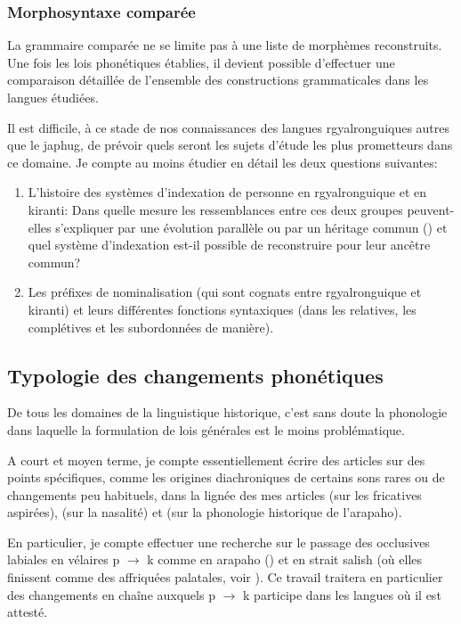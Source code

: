 \documentclass[oldfontcommands,oneside,a4paper,11pt]{article}
\newcommand{\ipa}[1]{{\phon #1}} %
\begin{document}
\subsubsection{Morphosyntaxe comparée}
La grammaire comparée ne se limite pas à une liste de morphèmes reconstruits. Une fois les lois phonétiques établies, il devient possible d'effectuer une comparaison détaillée de l'ensemble des constructions grammaticales dans les langues étudiées.

Il est difficile, à ce stade de nos connaissances des langues rgyalronguiques autres que le japhug, de prévoir quels seront les sujets d'étude les plus prometteurs dans ce domaine. Je compte au moins étudier en détail les deux questions suivantes:
\begin{enumerate}
\item L'histoire des systèmes d'indexation de personne en rgyalronguique et en kiranti: Dans quelle mesure les ressemblances entre ces deux groupes peuvent-elles s'expliquer par une évolution parallèle ou par un héritage commun (\citealt{jacques12agreement}) et quel système d'indexation est-il possible de reconstruire pour leur ancêtre commun?
\item Les préfixes de nominalisation (qui sont cognats entre rgyalronguique et kiranti) et leurs différentes fonctions syntaxiques (dans les relatives, les complétives et les subordonnées de manière).
\end{enumerate}

 



\subsection{Typologie des changements phonétiques } \label{sec:phonetique}
De tous les domaines de la linguistique historique, c'est sans doute la phonologie dans laquelle la formulation de lois générales est le moins problématique. 

A court et moyen terme, je compte essentiellement écrire des articles sur des points spécifiques, comme les origines diachroniques de certains sons rares ou de changements peu habituels, dans la lignée des mes articles \citet{jacques11lingua} (sur les fricatives aspirées), \citet{michaud-jacques12nasalite} (sur la nasalité) et \citet{jacques13arapaho} (sur la phonologie historique de l'arapaho). 

En particulier, je compte effectuer une recherche sur le passage des occlusives labiales en vélaires \ipa{*p} $\rightarrow$ \ipa{k}  comme en arapaho (\citealt{goddard74arapaho}) et en strait salish (où elles finissent comme des affriquées palatales, voir \citealt[10-11]{kuipers02salish}). Ce travail traitera en particulier des changements en chaîne auxquels \ipa{*p} $\rightarrow$ \ipa{k}  participe dans les langues où il est attesté.
\end{document}
